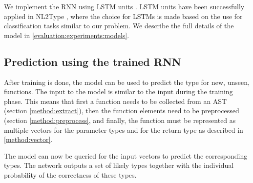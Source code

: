 We implement the RNN using LSTM units \cite{Gers1999LearningLSTM}. LSTM units have been successfully applied in NL2Type \cite{Malik2019NL2Type:Information}, where the choice for LSTMs is made based on the use for classification tasks similar to our problem. We describe the full details of the model in \ref{evaluation:experiments:models}.

\subsection{Prediction using the trained RNN} \label{method:prediction}
After training is done, the model can be used to predict the type for new, unseen, functions. The input to the model is similar to the input during the training phase. This means that first a function needs to be collected from an AST (section \ref{method:extract}), then the function elements need to be preprocessed (section \ref{method:preprocess}, and finally, the function must be represented as multiple vectors for the parameter types and for the return type as described in \ref{method:vector}.

The model can now be queried for the input vectors to predict the corresponding types. The network outputs a set of likely types together with the individual probability of the correctness of these types.

